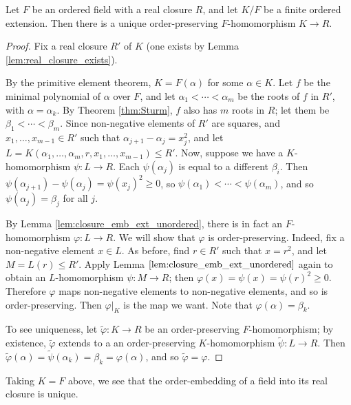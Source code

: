 \begin{lemma}
  \label{lem:closure_emb_ext}
  Let $F$ be an ordered field with a real closure $R$, and let $K/F$ be a finite ordered extension. Then there is a unique order-preserving $F$-homomorphism $K\to R$.
\end{lemma}
\begin{proof}
  Fix a real closure $R'$ of $K$ (one exists by Lemma \ref{lem:real_closure_exists}).
  
  By the primitive element theorem, $K=F(\alpha)$ for some $\alpha\in K$. Let $f$ be the minimal polynomial of $\alpha$ over $F$, and let $\alpha_1<\cdots<\alpha_m$ be the roots of $f$ in $R'$, with $\alpha=\alpha_k$. By Theorem \ref{thm:Sturm}, $f$ also has $m$ roots in $R$; let them be $\beta_1<\cdots<\beta_m$. Since non-negative elements of $R'$ are squares, and $x_1,\dots,x_{m-1}\in R'$ such that $\alpha_{j+1}-\alpha_j=x_j^2$, and let $L=K(\alpha_1,\dots,\alpha_m,r,x_1,\dots,x_{m-1})\leq R'$. Now, suppose we have a $K$-homomorphism $\psi:L\to R$. Each $\psi(\alpha_j)$ is equal to a different $\beta_i$. Then $\psi(\alpha_{j+1})-\psi(\alpha_j)=\psi(x_j)^2\geq0$, so $\psi(\alpha_1)<\cdots<\psi(\alpha_m)$, and so $\psi(\alpha_j)=\beta_j$ for all $j$.

  By Lemma \ref{lem:closure_emb_ext_unordered}, there is in fact an $F$-homomorphism $\varphi:L\to R$. We will show that $\varphi$ is order-preserving. Indeed, fix a non-negative element $x\in L$. As before, find $r\in R'$ such that $x=r^2$, and let $M=L(r)\leq R'$. Apply Lemma $\ref{lem:closure_emb_ext_unordered}$ again to obtain an $L$-homomorphism $\psi:M\to R$; then $\varphi(x)=\psi(x)=\psi(r)^2\geq0$. Therefore $\varphi$ maps non-negative elements to non-negative elements, and so is order-preserving. Then $\varphi|_K$ is the map we want. Note that $\varphi(\alpha)=\beta_k$.

  To see uniqueness, let $\tilde\varphi:K\to R$ be an order-preserving $F$-homomorphism; by existence, $\tilde\varphi$ extends to a an order-preserving $K$-homomorphism $\tilde\psi:L\to R$. Then $\tilde\varphi(\alpha)=\tilde\psi(\alpha_k)=\beta_k=\varphi(\alpha)$, and so $\tilde\varphi=\varphi$.
\end{proof}

Taking $K=F$ above, we see that the order-embedding of a field into its real closure is unique.

